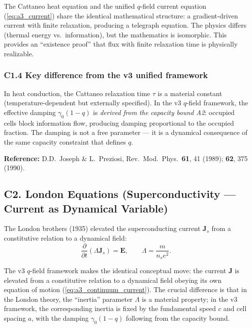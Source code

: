 \documentclass[reprint]{revtex4-2}
\begin{document}
The Cattaneo heat equation and the unified $q$-field current equation (\ref{eq:a3_current}) share the identical mathematical structure: a gradient-driven current with finite relaxation, producing a telegraph equation. The physics differs (thermal energy vs.\ information), but the mathematics is isomorphic. This provides an ``existence proof'' that flux with finite relaxation time is physically realizable.

\subsubsection{C1.4 Key difference from the v3 unified framework}

In heat conduction, the Cattaneo relaxation time $\tau$ is a material constant (temperature-dependent but externally specified). In the v3 $q$-field framework, the effective damping $\gamma_0(1-q)$ is \emph{derived from the capacity bound A2}: occupied cells block information flow, producing damping proportional to the occupied fraction. The damping is not a free parameter --- it is a dynamical consequence of the same capacity constraint that defines $q$.

\textbf{Reference:} D.D.\ Joseph \& L.\ Preziosi, Rev.\ Mod.\ Phys.\ \textbf{61}, 41 (1989); \textbf{62}, 375 (1990).

\subsection{C2. London Equations (Superconductivity --- Current as Dynamical Variable)}

The London brothers (1935) elevated the superconducting current $\mathbf{J}_s$ from a constitutive relation to a dynamical field:
\begin{equation}
\frac{\partial}{\partial t}(\Lambda\mathbf{J}_s) = \mathbf{E}, \qquad \Lambda = \frac{m}{n_s e^2}.
\end{equation}

The v3 $q$-field framework makes the identical conceptual move: the current $\mathbf{J}$ is elevated from a constitutive relation to a dynamical field obeying its own equation of motion (\ref{eq:a3_continuum_current}). The crucial difference is that in the London theory, the ``inertia'' parameter $\Lambda$ is a material property; in the v3 framework, the corresponding inertia is fixed by the fundamental speed $c$ and cell spacing $a$, with the damping $\gamma_0(1-q)$ following from the capacity bound.
\end{document}
